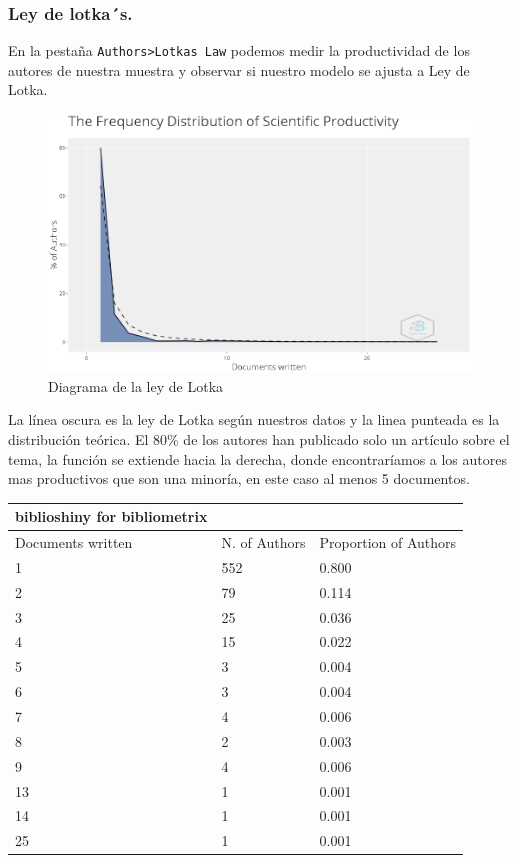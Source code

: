 \documentclass[
]{article}
\begin{document}
\hypertarget{ley-de-lotkas.}{%
\subsubsection{Ley de lotka´s.}\label{ley-de-lotkas.}}

En la pestaña
\texttt{Authors\textgreater{}Lotka\textquotesingle{}s\ Law} podemos
medir la productividad de los autores de nuestra muestra y observar si
nuestro modelo se ajusta a Ley de Lotka.

\begin{figure}
\centering
\includegraphics{LotkasLaw.png}
\caption{Diagrama de la ley de Lotka}
\end{figure}

La línea oscura es la ley de Lotka según nuestros datos y la linea
punteada es la distribución teórica. El 80\% de los autores han
publicado solo un artículo sobre el tema, la función se extiende hacia
la derecha, donde encontraríamos a los autores mas productivos que son
una minoría, en este caso al menos 5 documentos.

\begin{longtable}[]{@{}lll@{}}
\toprule
biblioshiny for bibliometrix & & \\
\midrule
\endhead
Documents written & N. of Authors & Proportion of Authors \\
1 & 552 & 0.800 \\
2 & 79 & 0.114 \\
3 & 25 & 0.036 \\
4 & 15 & 0.022 \\
5 & 3 & 0.004 \\
6 & 3 & 0.004 \\
7 & 4 & 0.006 \\
8 & 2 & 0.003 \\
9 & 4 & 0.006 \\
13 & 1 & 0.001 \\
14 & 1 & 0.001 \\
25 & 1 & 0.001 \\
\bottomrule
\end{longtable}
\end{document}
